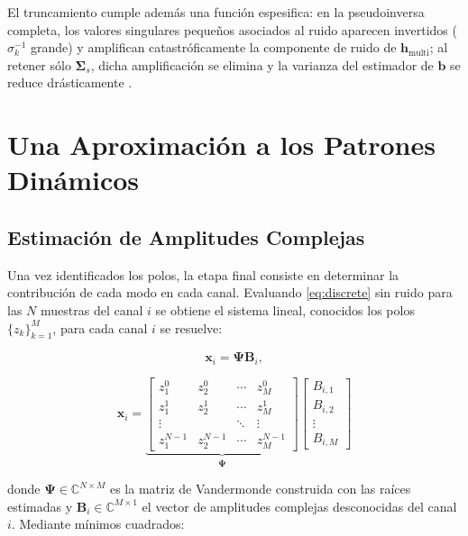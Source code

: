 El truncamiento cumple además una función
espesifica: en la pseudoinversa completa, los valores singulares pequeños asociados al 
ruido aparecen invertidos ($\sigma_k^{-1}$ grande) y amplifican catastróficamente la 
componente de ruido de $\mathbf{h}_{\mathrm{multi}}$; al retener sólo
$\boldsymbol{\Sigma}_s$, dicha amplificación se elimina y la varianza del
estimador de $\mathbf{b}$ se reduce drásticamente
\cite{Tufts1982,brunton2022}.


\section{Una Aproximación a los Patrones Dinámicos}
\label{cap:ArprochDynamicPatterns}


\subsection{Estimación de Amplitudes Complejas}

Una vez identificados los polos, la etapa final consiste en determinar la contribución de 
cada modo en cada canal. Evaluando \eqref{eq:discrete} sin ruido para las $N$ muestras 
del canal $i$ se obtiene el sistema lineal, conocidos los polos $\{z_k\}_{k=1}^{M}$, para 
cada canal $i$ se resuelve:

\begin{equation}
\mathbf{x}_i = \mathbf{\Psi} \mathbf{B}_i,
\label{eq:vandermonde_system}
\end{equation}

\begin{equation}
\mathbf{x}_i = \underbrace{
\begin{bmatrix}
    z_1^0 & z_2^0 & \cdots & z_M^0 \\
    z_1^1 & z_2^1 & \cdots & z_M^1 \\
    \vdots &      & \ddots & \vdots \\
    z_1^{N-1} & z_2^{N-1} & \cdots & z_M^{N-1}
\end{bmatrix}
}_{\boldsymbol{\Psi}}
\begin{bmatrix} B_{i,1} \\ B_{i,2} \\ \vdots \\ B_{i,M} \end{bmatrix}
\end{equation}

donde $\mathbf{\Psi} \in \mathbb{C}^{N \times M}$ es la matriz de Vandermonde construida 
con las raíces estimadas y $\mathbf{B}_i \in \mathbb{C}^{M \times 1}$ el vector de amplitudes 
complejas desconocidas del canal $i$. Mediante mínimos cuadrados:

